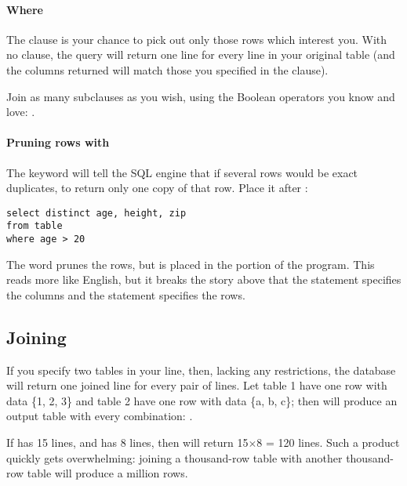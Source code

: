 \paragraph{Where}
The  clause is your chance to pick out only those rows which
interest you. With no  clause, the query will return one line
for every line in your original table (and the columns returned will
match those you specified in the  clause).

Join as many subclauses as you wish, using the Boolean operators you
know and love: .


\paragraph{Pruning rows with } The 
keyword will tell the SQL engine that if several rows would be exact
duplicates, to return only one copy of that row. Place it after 
: 
\begin{lstlisting}
select distinct age, height, zip
from table
where age > 20
\end{lstlisting}
The   word prunes the rows, but is placed in the 
 portion of the program.  This reads more like English, but it
breaks the story above that the  statement specifies the
columns and the  statement specifies the rows.

\subsection{Joining}
If you specify two tables in your  line, then, lacking any
restrictions, the database will return one joined line for every pair of lines.
Let table 1 have one row with data \{1, 2, 3\} and table 2 have one row
with data \{a, b, c\}; then  will
produce an output table with every combination:
. 

If  has 15 lines, and  has 8 lines, then
 will return 15$\times$8 = 120 lines.
Such a product quickly gets overwhelming: joining a thousand-row table
with another thousand-row table will produce a million rows.

